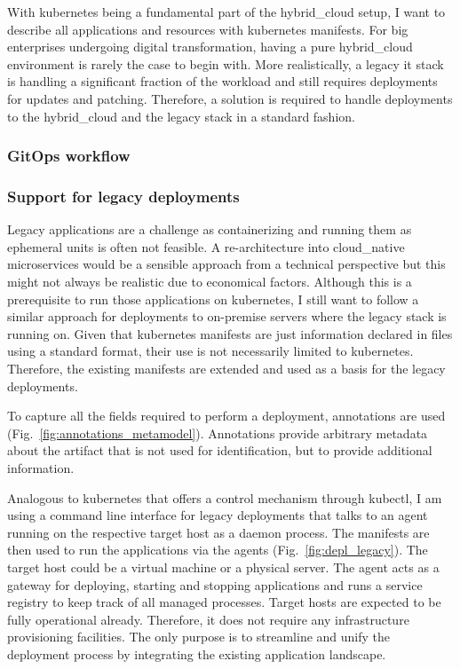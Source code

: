 \documentclass[../main.tex]{subfiles}
\begin{document}
    With \gls{kubernetes} being a fundamental part of the \gls{hybrid_cloud} setup, I want to describe all applications and resources with \gls{kubernetes} manifests.
    For big enterprises undergoing digital transformation, having a pure \gls{hybrid_cloud} environment is rarely the case to begin with.
    More realistically, a legacy \acrshort{it} stack is handling a significant fraction of the workload and still requires deployments for updates and patching.
    Therefore, a solution is required to handle deployments to the \gls{hybrid_cloud} and the legacy stack in a standard fashion.

    \subsubsection{GitOps workflow}

    

    \subsubsection{Support for legacy deployments}

    Legacy applications are a challenge as containerizing and running them as ephemeral units is often not feasible.
    A re-architecture into \gls{cloud_native} microservices would be a sensible approach from a technical perspective but this might not always be realistic due to economical factors.
    Although this is a prerequisite to run those applications on \gls{kubernetes}, I still want to follow a similar approach for deployments to on-premise servers where the legacy stack is running on.
    Given that \gls{kubernetes} manifests are just information declared in files using a standard format, their use is not necessarily limited to \gls{kubernetes}.
    Therefore, the existing manifests are extended and used as a basis for the legacy deployments.

    To capture all the fields required to perform a deployment, annotations are used (Fig.~\ref{fig:annotations_metamodel}).
    Annotations provide arbitrary metadata about the artifact that is not used for identification, but to provide additional information.\cite{k8_api_annotations}

    

    Analogous to \gls{kubernetes} that offers a control mechanism through \gls{kubectl}, I am using a command line interface for legacy deployments that talks to an agent running on the respective target host as a daemon process.
    The manifests are then used to run the applications via the agents (Fig.~\ref{fig:depl_legacy}).
    The target host could be a virtual machine or a physical server.
    The agent acts as a gateway for deploying, starting and stopping applications and runs a service registry to keep track of all managed processes.
    Target hosts are expected to be fully operational already.
    Therefore, it does not require any infrastructure provisioning facilities.
    The only purpose is to streamline and unify the deployment process by integrating the existing application landscape.
\end{document}
